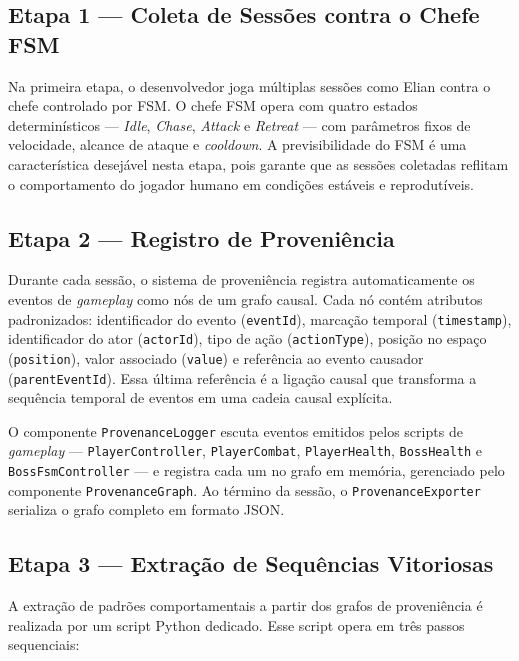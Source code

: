 \subsection{Etapa 1 --- Coleta de Sessões contra o Chefe FSM}
\label{subsec:etapa1}

Na primeira etapa, o desenvolvedor joga múltiplas sessões como Elian contra o
chefe controlado por FSM. O chefe FSM opera com quatro estados determinísticos
--- \textit{Idle}, \textit{Chase}, \textit{Attack} e \textit{Retreat} ---
com parâmetros fixos de velocidade, alcance de ataque e \textit{cooldown}. A
previsibilidade do FSM é uma característica desejável nesta etapa, pois
garante que as sessões coletadas reflitam o comportamento do jogador humano
em condições estáveis e reprodutíveis.

\subsection{Etapa 2 --- Registro de Proveniência}
\label{subsec:etapa2}

Durante cada sessão, o sistema de proveniência registra automaticamente os
eventos de \textit{gameplay} como nós de um grafo causal. Cada nó contém
atributos padronizados: identificador do evento (\texttt{eventId}), marcação
temporal (\texttt{timestamp}), identificador do ator (\texttt{actorId}), tipo
de ação (\texttt{actionType}), posição no espaço (\texttt{position}), valor
associado (\texttt{value}) e referência ao evento causador
(\texttt{parentEventId}). Essa última referência é a ligação causal que
transforma a sequência temporal de eventos em uma cadeia causal explícita.

O componente \texttt{ProvenanceLogger} escuta eventos emitidos pelos scripts
de \textit{gameplay} --- \texttt{PlayerController}, \texttt{PlayerCombat},
\texttt{PlayerHealth}, \texttt{BossHealth} e \texttt{BossFsmController} ---
e registra cada um no grafo em memória, gerenciado pelo componente
\texttt{ProvenanceGraph}. Ao término da sessão, o
\texttt{ProvenanceExporter} serializa o grafo completo em formato JSON.

\subsection{Etapa 3 --- Extração de Sequências Vitoriosas}
\label{subsec:etapa3}

A extração de padrões comportamentais a partir dos grafos de proveniência é
realizada por um script Python dedicado. Esse script opera em três passos
sequenciais:

